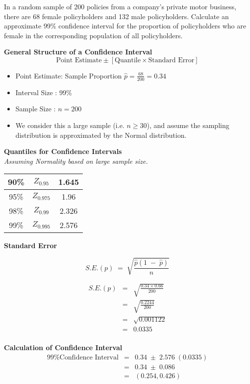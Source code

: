 \documentclass[a4paper,12pt]{article}
\begin{document}
 In a random sample of 200 policies from a company’s private motor business, there are 68 female policyholders and 132 male policyholders.
Calculate an approximate 99\% confidence interval for the proportion of policyholders who are female in the corresponding population of all policyholders.

\begin{framed}
\noindent \textbf{General Structure of a Confidence Interval}
\[  \mbox{Point Estimate} \pm \left[ \mbox{Quantile} \times \mbox{Standard Error}\right]\]
\end{framed}


\begin{itemize}
\item Point Estimate: Sample Proportion ${ \displaystyle \hat{p} = \frac{68}{200} = 0.34 }$
\item Interval Size : 99\%
\item Sample Size : $n=200$
\item We consider this a large sample (i.e. $n \geq 30$), and assume the sampling distribution is approximated by the Normal distribution.
\end{itemize}
\noindent \textbf{Quantiles for Confidence Intervals}
\\ \textit{ Assuming Normality based on large sample size.}\\
\begin{center}
\begin{tabular}{|c|c|c|} \hline
90\%     & $Z_{0.95}$ & 1.645 \\ \hline
95\%     & $Z_{0.975}$ & 1.96 \\ \hline
98\%    & $Z_{0.99}$ & 2.326    \\ \hline
99\%    & $Z_{0.995}$ &  2.576  \\ \hline
\end{tabular}
\end{center}
\noindent \textbf{Standard Error}
\begin{framed}
\[ S.E.(p) \;=\; \sqrt{ \frac{\hat{p} (1\;-\;\hat{p})  }{n}  } \]
\end{framed}

\begin{eqnarray*} S.E.(p) &=& \sqrt{ \frac{0.34 \times 0.66 }{200}  }\\
&=& \sqrt{ \frac{0.2244 }{200}  }\\
&=& \sqrt{ 0.001122 }\\
&=& 0.0335 \\
\end{eqnarray*}
\medskip

\noindent \textbf{Calculation of Confidence Interval}
\begin{eqnarray*}
\mbox{99\% Confidence Interval} &=& 0.34 \;\pm\; 2.576\;(0.0335)\\
&=& 0.34 \;\pm\; 0.086 \\
&=& (0.254, 0.426)\\
\end{eqnarray*}
\end{document}
